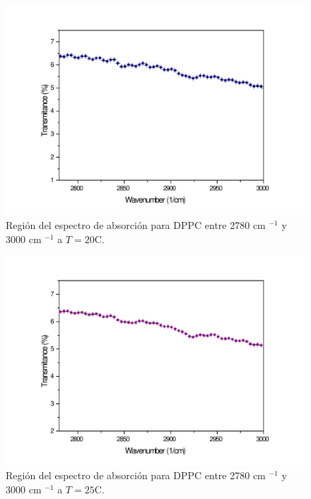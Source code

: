 \documentclass[%
 reprint,
 amsmath,amssymb,
 aps,
]{revtex4-1}
\begin{document}
\begin{figure}[ht]
\includegraphics[scale=0.25]{FTIR/20C.pdf}
  \caption{Región del espectro de absorción para DPPC entre 2780 cm $^{-1}$ y 3000 cm $^{-1}$ a $T=20$\textdegree C.}
  \label{fig:espa20}
\end{figure}
\begin{figure}[ht]
\includegraphics[scale=0.25]{FTIR/25C.pdf}
  \caption{Región del espectro de absorción para DPPC entre 2780 cm $^{-1}$ y 3000 cm $^{-1}$ a $T=25$\textdegree C.}
  \label{fig:espa25}
\end{figure}
\end{document}
